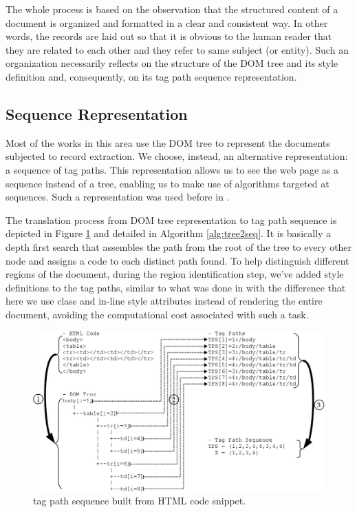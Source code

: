 \documentclass{vldb}
\begin{document}
The whole process is based on the observation that the structured content of a
document is organized and formatted in a clear and consistent way. In other
words, the records are laid out so that it is obvious to the human reader that
they are related to each other and they refer to same subject (or entity). Such
an organization necessarily reflects on the structure of the DOM tree and its
style definition and, consequently, on its tag path sequence representation.

\subsection{Sequence Representation}\label{ss:seq}
Most of the works in this area use the DOM tree to represent the documents
subjected to record extraction. We choose, instead, an alternative
representation: a sequence of tag paths. This representation allows us to see
the web page as a sequence instead of a tree, enabling us to make use of
algorithms targeted at sequences. Such a representation was used before in
\cite{TPC09, SuffixTree12, TPS2013}.

The translation process from DOM tree representation to tag path sequence is
depicted in Figure \ref{fig:tree2seq} and detailed in Algorithm
\ref{alg:tree2seq}. It is basically a depth first search that assembles the path
from the root of the tree to every other node and assigns a code to each
distinct path found. To help distinguish different regions of the document,
during the region identification step, we've added style definitions to the tag
paths, similar to what was done in \cite{clustVX2014} with the difference that
here we use class and in-line style attributes instead of rendering the entire
document, avoiding the computational cost associated with such a task.

\begin{figure}[h]
  \centering
     \includegraphics[width=\columnwidth]{img/tree2seq.jpg}
  \caption{tag path sequence built from HTML code snippet.}
  \label{fig:tree2seq}
\end{figure}
\end{document}
